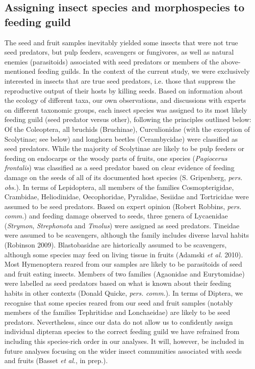 \documentclass[11pt]{article}
\begin{document}
\subsection*{Assigning insect species and morphospecies to feeding guild}

The seed and fruit samples inevitably yielded some insects that were not true seed predators, but pulp feeders, scavengers or fungivores, as well as natural enemies (parasitoids) associated with seed predators or members of the above-mentioned feeding guilds. In the context of the current study, we were exclusively interested in insects that are true seed predators, i.e. those that suppress the reproductive output of their hosts by killing seeds. Based on information about the ecology of different taxa, our own observations, and discussions with experts on different taxonomic groups, each insect species was assigned to its most likely feeding guild (seed predator versus other), following the principles outlined below:
Of the Coleoptera, all bruchids (Bruchinae), Curculionidae (with the exception of Scolytinae; see below) and longhorn beetles (Cerambycidae) were classified as seed predators. While the majority of Scolytinae are likely to be pulp feeders or feeding on endocarps or the woody parts of fruits, one species (\emph{Pagiocerus frontalis}) was classified as a seed predator based on clear evidence of feeding damage on the seeds of all of its documented host species (S. Gripenberg, \emph{pers. obs.}). 
In terms of Lepidoptera, all members of the families Cosmopterigidae, Crambidae, Heliodinidae, Oecophoridae, Pyralidae, Sesiidae and Tortricidae were assumed to be seed predators. Based on expert opinion (Robert Robbins, \emph{pers. comm.}) and feeding damage observed to seeds, three genera of Lycaenidae (\emph{Strymon}, \emph{Strephonota} and \emph{Tmolus}) were assigned as seed predators. Tineidae were assumed to be scavengers, although the family includes diverse larval habits (Robinson 2009). Blastobasidae are historically assumed to be scavengers, although some species may feed on living tissue in fruits (Adamski \emph{et al. }2010).
Most Hymenoptera reared from our samples are likely to be parasitoids of seed and fruit eating insects. Members of two families (Agaonidae and Eurytomidae) were labelled as seed predators based on what is known about their feeding habits in other contexts (Donald Quicke,\emph{ pers. comm.}). 
In terms of Diptera, we recognise that some species reared from our seed and fruit samples (notably members of the families Tephritidae and Lonchaeidae) are likely to be seed predators. Nevertheless, since our data do not allow us to confidently assign individual dipteran species to the correct feeding guild we have refrained from including this species-rich order in our analyses. It will, however, be included in future analyses focusing on the wider insect communities associated with seeds and fruits (Basset \emph{et al.}, in prep.).
\end{document}
